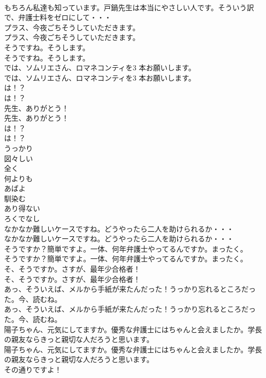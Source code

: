 \documentclass[8pt]{extreport}
\begin{document}
\begin{CJK}{UTF8}{min}
\\	もちろん私達も知っています。戸鍋先生は本当にやさしい人です。そういう訳で、弁護士料をゼロにして・・・ 
\\	プラス、今夜ごちそうしていただきます。	
\\	プラス、今夜ごちそうしていただきます。 
\\	そうですね。そうします。	
\\	そうですね。そうします。 
\\	では、ソムリエさん、ロマネコンティを3 本お願いします。	
\\	では、ソムリエさん、ロマネコンティを3 本お願いします。 
\\	は！？	
\\	は！？ 
\\	先生、ありがとう！	
\\	先生、ありがとう！ 
\\	は！？	
\\	は！？ 
\\	うっかり
\\	図々しい
\\	全く
\\	何よりも
\\	あばよ
\\	馴染む
\\	あり得ない
\\	ろくでなし
\\	なかなか難しいケースですね。どうやったら二人を助けられるか・・・	
\\	なかなか難しいケースですね。どうやったら二人を助けられるか・・・ 
\\	そうですか？簡単ですよ。一体、何年弁護士やってるんですか。まったく。	
\\	そうですか？簡単ですよ。一体、何年弁護士やってるんですか。まったく。 
\\	そ、そうですか。さすが、最年少合格者！	
\\	そ、そうですか。さすが、最年少合格者！ 
\\	あっ、そういえば、メルから手紙が来たんだった！うっかり忘れるところだった。今、読むね。	
\\	あっ、そういえば、メルから手紙が来たんだった！うっかり忘れるところだった。今、読むね。 
\\	陽子ちゃん、元気にしてますか。優秀な弁護士にはちゃんと会えましたか。学長の親友ならきっと親切な人だろうと思います。	
\\	陽子ちゃん、元気にしてますか。優秀な弁護士にはちゃんと会えましたか。学長の親友ならきっと親切な人だろうと思います。 
\\	その通りですよ！	

\end{CJK}
\end{document}
